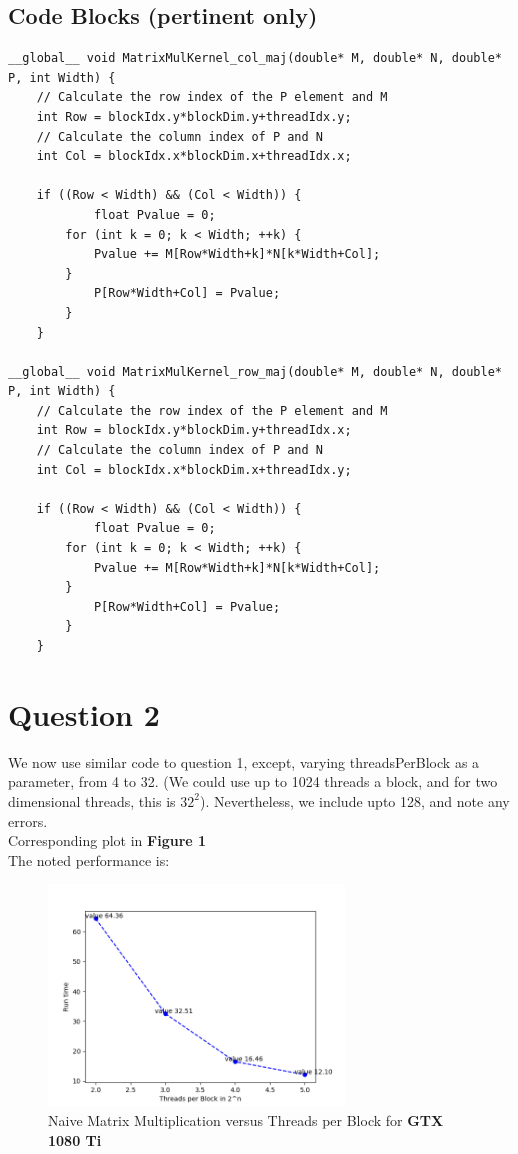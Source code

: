 \subsection {Code Blocks (pertinent only)}
\begin{lstlisting}
__global__ void MatrixMulKernel_col_maj(double* M, double* N, double* P, int Width) { 
    // Calculate the row index of the P element and M
    int Row = blockIdx.y*blockDim.y+threadIdx.y;
    // Calculate the column index of P and N
    int Col = blockIdx.x*blockDim.x+threadIdx.x; 
    
    if ((Row < Width) && (Col < Width)) {
            float Pvalue = 0;
        for (int k = 0; k < Width; ++k) {
            Pvalue += M[Row*Width+k]*N[k*Width+Col];
        }
            P[Row*Width+Col] = Pvalue;
        }
    }

__global__ void MatrixMulKernel_row_maj(double* M, double* N, double* P, int Width) { 
    // Calculate the row index of the P element and M
    int Row = blockIdx.y*blockDim.y+threadIdx.x;
    // Calculate the column index of P and N
    int Col = blockIdx.x*blockDim.x+threadIdx.y; 
    
    if ((Row < Width) && (Col < Width)) {
            float Pvalue = 0;
        for (int k = 0; k < Width; ++k) {
            Pvalue += M[Row*Width+k]*N[k*Width+Col];
        }
            P[Row*Width+Col] = Pvalue;
        }
    }

\end{lstlisting}
\bigskip

\section{Question 2}

We now use similar code to question 1, except, varying threadsPerBlock as a parameter, from 4 to 32. (We could use up to 1024 threads a block, and for two dimensional threads, this is $32^2$). Nevertheless, we include upto 128, and note any errors. \\

Corresponding plot in \textbf{Figure 1}\\

The noted performance is:

\begin{figure}[ht]
\centering
\includegraphics[angle=0,width=0.7\textwidth]{assignment-2/report/q2.png}
\caption{Naive Matrix Multiplication versus Threads per Block for \textbf{GTX 1080 Ti}}
\end{figure}


